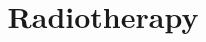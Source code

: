 \documentclass{article}
\title{Radiotherapy}
\date{}
\begin{document}
	\maketitle
	\tableofcontents
	
	\begin{abstract}
		
	\end{abstract}
	
	
\end{document}
